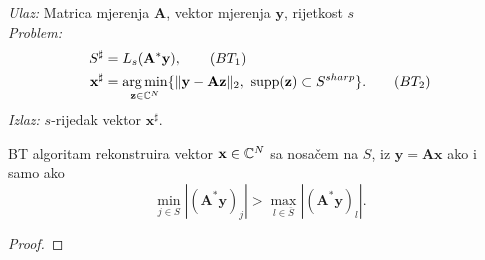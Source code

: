 \documentclass[a4paper,twoside,12pt]{memoir} %
\newcommand{\vect}[1]{\mathbf{#1}}
\renewcommand{\vec}{\vect}
\newcommand{\supp}{\text{\normalfont{supp}}}
\newcommand{\norm}[1]{\|{#1}\|}
\DeclareMathOperator*{\argmin}{arg\,min}
\newenvironment{alg}[1]
{
    \bigskip
    \begin{tcolorbox}[arc=0mm,boxrule=1.2pt,colframe=black,colback=white,detach title, before upper={\medskip\begin{center}\textbf{#1}\end{center}\hline\newline\medskip},frame hidden]
    \medskip
}
{
    \medskip
\end{tcolorbox}
    \bigskip
}
\begin{document}
\begin{alg}{BT}
    \textit{Ulaz:} Matrica mjerenja $\vec A$, vektor mjerenja $\vec y$, rijetkost $s$ \\
    \textit{Problem:}
        \begin{align*}
            S^{\sharp} &= L_s(\vec A^* \vec y),\tag{$BT_1$}\label{bt_1}\\
            \vec x^{\sharp} &= \argmin_{\vec z \in \C^N}\{\norm{\vec y - \vec{Az}}_2,\ \supp(\vec z) \subset S^{sharp}\}.\tag{$BT_2$}\label{bt_2}\\
        \end{align*}
        \textit{Izlaz:} $s$-rijedak vektor $\vec x^{\sharp}$.
\end{alg}

\begin{prop}
    BT algoritam rekonstruira vektor $\vec x \in \C^N$ sa nosa\v{c}em na $S$, iz $\vec y = \vec{Ax}$ ako i samo ako
    \begin{equation}\label{bt_uvjet}
        \min_{j \in S}|(\vec A^* \vec y)_j| > \max_{l \in \bar{S}} |(\vec A^* \vec y)_l| .
    \end{equation}
\end{prop}
\begin{proof}
\end{proof}




\pagestyle{empty} %


\begin{sazetak}
\end{sazetak}

\begin{summary}
\end{summary}


\begin{cv}
\end{cv}
\end{document}
